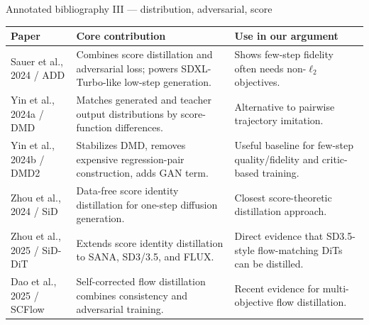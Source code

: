 \documentclass[aspectratio=169,10pt]{beamer}
\begin{document}
\begin{frame}[shrink=6]{Annotated bibliography III --- distribution, adversarial, score}
  \scriptsize
  \begin{adjustbox}{max width=\textwidth, max height=0.78\textheight, center}
  \begin{tabular}{@{}L{0.22\textwidth}L{0.34\textwidth}L{0.34\textwidth}@{}}
    \toprule
    \textbf{Paper} & \textbf{Core contribution} & \textbf{Use in our argument} \\
    \midrule
    Sauer et al., 2024 / ADD & Combines score distillation and adversarial loss; powers SDXL-Turbo-like low-step generation. & Shows few-step fidelity often needs non-$\ell_2$ objectives. \\
    Yin et al., 2024a / DMD & Matches generated and teacher output distributions by score-function differences. & Alternative to pairwise trajectory imitation. \\
    Yin et al., 2024b / DMD2 & Stabilizes DMD, removes expensive regression-pair construction, adds GAN term. & Useful baseline for few-step quality/fidelity and critic-based training. \\
    Zhou et al., 2024 / SiD & Data-free score identity distillation for one-step diffusion generation. & Closest score-theoretic distillation approach. \\
    Zhou et al., 2025 / SiD-DiT & Extends score identity distillation to SANA, SD3/3.5, and FLUX. & Direct evidence that SD3.5-style flow-matching DiTs can be distilled. \\
    Dao et al., 2025 / SCFlow & Self-corrected flow distillation combines consistency and adversarial training. & Recent evidence for multi-objective flow distillation. \\
    \bottomrule
  \end{tabular}
  \end{adjustbox}
\end{frame}
\end{document}

